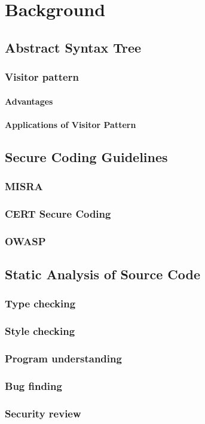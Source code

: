  
\chapter{Background}

\section{Abstract Syntax Tree}
 

 
 
\subsection{Visitor pattern} 
 

 
 \subsubsection{Advantages}
  
\subsubsection{Applications of Visitor Pattern}
 
 \section{Secure Coding Guidelines}
 
 
 \subsection{MISRA}
 
 
 
  \subsection{CERT Secure Coding}
 
 
 \subsection{OWASP}
   
\section{Static Analysis of Source Code} 
 

 
\subsection{Type checking}
 
\subsection{Style checking}
 
 
\subsection{Program understanding}
 
\subsection{Bug finding}
  
\subsection{Security review}
 
 